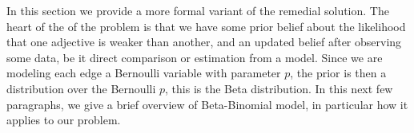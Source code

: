 In this section we provide a more formal variant of the remedial solution. The heart of the of the problem is that we have some prior belief about the likelihood that one adjective is weaker than another, and an updated belief after observing some data, be it direct comparison or estimation from a model. Since we are modeling each edge a Bernoulli variable with parameter $p$, the prior is then a distribution over the Bernoulli $p$, this is the Beta distribution. In this next few paragraphs, we give a brief overview of Beta-Binomial model, in particular how it applies to our problem. 













































